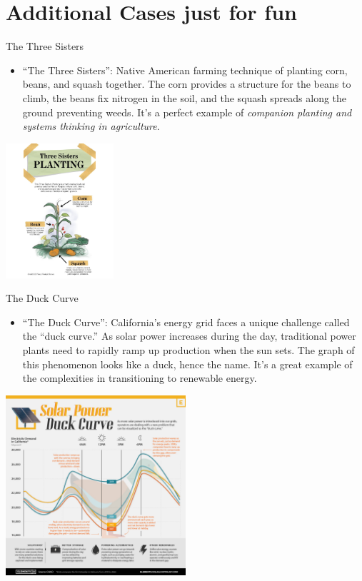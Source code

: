 \documentclass[
  ignorenonframetext,
]{beamer}
\providecommand{\tightlist}{%
  \setlength{\itemsep}{0pt}\setlength{\parskip}{0pt}}\usepackage{longtable,booktabs,array}
\begin{document}
\section{Additional Cases just for
fun}\label{additional-cases-just-for-fun}

\begin{frame}{The Three Sisters}
\label{the-three-sisters}
\begin{itemize}
\tightlist
\item
  ``The Three Sisters'': Native American farming technique of planting
  corn, beans, and squash together. The corn provides a structure for
  the beans to climb, the beans fix nitrogen in the soil, and the squash
  spreads along the ground preventing weeds. It's a perfect example of
  \emph{companion planting and systems thinking in agriculture}.
\end{itemize}

\includegraphics[width=0.3\textwidth,height=\textheight]{L2_files/mediabag/three-sisters-planti.jpg}
\end{frame}

\begin{frame}{The Duck Curve}
\label{the-duck-curve}
\begin{itemize}
\tightlist
\item
  ``The Duck Curve'': California's energy grid faces a unique challenge
  called the ``duck curve.'' As solar power increases during the day,
  traditional power plants need to rapidly ramp up production when the
  sun sets. The graph of this phenomenon looks like a duck, hence the
  name. It's a great example of the complexities in transitioning to
  renewable energy.
\end{itemize}

\includegraphics[width=0.5\textwidth,height=\textheight]{L2_files/mediabag/VCE-The-Duck-Curve-M.jpg}
\end{frame}
\end{document}
